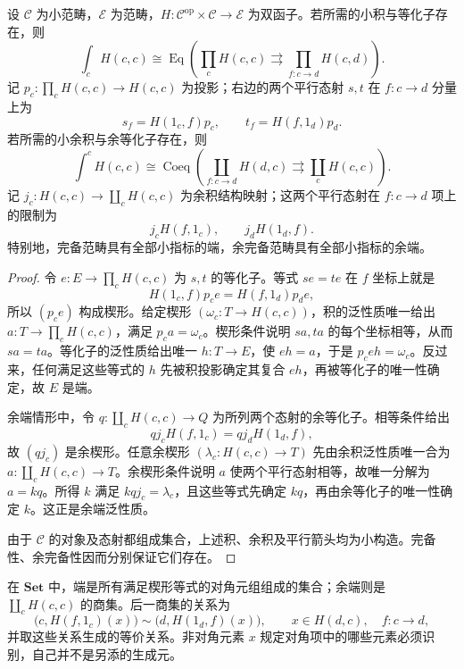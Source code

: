 \begin{theorem}[端与余端的等化子公式]\label{b4:thm:end-coend-equalizer}
	设 \(\mathcal C\) 为小范畴，\(\mathcal E\) 为范畴，\(H:\mathcal C^{\mathrm{op}}\times\mathcal C\rightarrow\mathcal E\) 为双函子。若所需的小积与等化子存在，则
	\[
		\int_cH(c,c)\cong
		\operatorname{Eq}\left(
		\prod_cH(c,c)\rightrightarrows
		\prod_{f:c\rightarrow d}H(c,d)\right).
	\]
	记 \(p_c:\prod_cH(c,c)\rightarrow H(c,c)\) 为投影；右边的两个平行态射 \(s,t\) 在 \(f:c\rightarrow d\) 分量上为
	\[
		s_f=H(1_c,f)p_c,\qquad t_f=H(f,1_d)p_d.
	\]
	若所需的小余积与余等化子存在，则
	\[
		\int^cH(c,c)\cong
		\operatorname{Coeq}\left(
		\coprod_{f:c\rightarrow d}H(d,c)\rightrightarrows
		\coprod_cH(c,c)\right).
	\]
	记 \(j_c:H(c,c)\rightarrow\coprod_cH(c,c)\) 为余积结构映射；这两个平行态射在 \(f:c\rightarrow d\) 项上的限制为
	\[
		j_cH(f,1_c),\qquad j_dH(1_d,f).
	\]
	特别地，完备范畴具有全部小指标的端，余完备范畴具有全部小指标的余端。
\end{theorem}
\begin{proof}
	令 \(e:E\rightarrow\prod_cH(c,c)\) 为 \(s,t\) 的等化子。等式 \(se=te\) 在 \(f\) 坐标上就是
	\[
		H(1_c,f)p_ce=H(f,1_d)p_de,
	\]
	所以 \((p_ce)\) 构成楔形。给定楔形 \((\omega_c:T\rightarrow H(c,c))\)，积的泛性质唯一给出 \(a:T\rightarrow\prod_cH(c,c)\)，满足 \(p_ca=\omega_c\)。楔形条件说明 \(sa,ta\) 的每个坐标相等，从而 \(sa=ta\)。等化子的泛性质给出唯一 \(h:T\rightarrow E\)，使 \(eh=a\)，于是 \(p_ceh=\omega_c\)。反过来，任何满足这些等式的 \(h\) 先被积投影确定其复合 \(eh\)，再被等化子的唯一性确定，故 \(E\) 是端。

	余端情形中，令 \(q:\coprod_cH(c,c)\rightarrow Q\) 为所列两个态射的余等化子。相等条件给出
	\[
		qj_cH(f,1_c)=qj_dH(1_d,f),
	\]
	故 \((qj_c)\) 是余楔形。任意余楔形 \((\lambda_c:H(c,c)\rightarrow T)\) 先由余积泛性质唯一合为 \(a:\coprod_cH(c,c)\rightarrow T\)。余楔形条件说明 \(a\) 使两个平行态射相等，故唯一分解为 \(a=kq\)。所得 \(k\) 满足 \(kqj_c=\lambda_c\)，且这些等式先确定 \(kq\)，再由余等化子的唯一性确定 \(k\)。这正是余端泛性质。

	由于 \(\mathcal C\) 的对象及态射都组成集合，上述积、余积及平行箭头均为小构造。完备性、余完备性因而分别保证它们存在。
\end{proof}

在 \(\mathbf{Set}\) 中，端是所有满足楔形等式的对角元组组成的集合；余端则是 \(\coprod_cH(c,c)\) 的商集。后一商集的关系为
\begin{equation}\label{b4:eq:set-coend-relation}
	\bigl(c,H(f,1_c)(x)\bigr)
	\sim\bigl(d,H(1_d,f)(x)\bigr),
	\qquad x\in H(d,c),\quad f:c\rightarrow d,
\end{equation}
并取这些关系生成的等价关系。非对角元素 \(x\) 规定对角项中的哪些元素必须识别，自己并不是另添的生成元。

